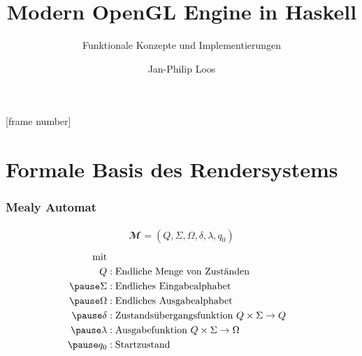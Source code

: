 
[frame number]



\title[Haskell Engine]{Modern OpenGL Engine in Haskell}
\subtitle[Konzepte]{Funktionale Konzepte und Implementierungen}
\author{Jan-Philip Loos}
\date{\protect{}}
\maketitle
{}

\frame{\tableofcontents}
\section{Formale Basis des Rendersystems}
\frame{\sectionpage}

\begin{frame}
  \frametitle{Mealy Automat}
  \begin{Definition}
    \begin{align}
    \mathbfcal{M} = \left( Q, \Sigma, \Omega, \delta, \lambda, q_0 \right)
    \label{def:mealy-formal}
    \end{align}
    \begin{align*}
    	\text{mit}\\
    	Q &: \text{Endliche Menge von Zuständen} \\\pause
    	\Sigma  &:\text{Endliches Eingabealphabet} \\\pause
    	\Omega  &:\text{Endliches Ausgabealphabet} \\\pause
    	\delta  &:\text{Zustandsübergangsfunktion}\ Q \times \Sigma \rightarrow Q \\\pause
    	\lambda &:\text{Ausgabefunktion}\ Q \times \Sigma \rightarrow \Omega \\\pause
    	q_0 &: \text{Startzustand}
    \end{align*}
  \end{Definition}
\end{frame}


